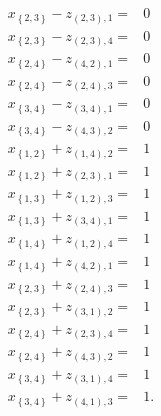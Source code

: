 \documentclass[10p,a4paper,BCOR = 12mm, DIV=15]{scrbook}
\begin{document}
{\begin{bew}
{\begin{align*}
x_{\left\{2, 3\right\}} - z_{\left(2, 3\right), 1} = & 0 \\
x_{\left\{2, 3\right\}} - z_{\left(2, 3\right), 4} = & 0 \\
x_{\left\{2, 4\right\}} - z_{\left(4, 2\right), 1} = & 0 \\
x_{\left\{2, 4\right\}} - z_{\left(2, 4\right), 3} = & 0 \\
x_{\left\{3, 4\right\}} - z_{\left(3, 4\right), 1} = & 0 \\
x_{\left\{3, 4\right\}} - z_{\left(4, 3\right), 2} = & 0 \\
x_{\left\{1, 2\right\}} + z_{\left(1, 4\right), 2} = & 1 \\
x_{\left\{1, 2\right\}} + z_{\left(2, 3\right), 1} = & 1 \\
x_{\left\{1, 3\right\}} + z_{\left(1, 2\right), 3} = & 1 \\
x_{\left\{1, 3\right\}} + z_{\left(3, 4\right), 1} = & 1 \\
x_{\left\{1, 4\right\}} + z_{\left(1, 2\right), 4} = & 1 \\
x_{\left\{1, 4\right\}} + z_{\left(4, 2\right), 1} = & 1 \\
x_{\left\{2, 3\right\}} + z_{\left(2, 4\right), 3} = & 1 \\
x_{\left\{2, 3\right\}} + z_{\left(3, 1\right), 2} = & 1 \\
x_{\left\{2, 4\right\}} + z_{\left(2, 3\right), 4} = & 1 \\
x_{\left\{2, 4\right\}} + z_{\left(4, 3\right), 2} = & 1 \\
x_{\left\{3, 4\right\}} + z_{\left(3, 1\right), 4} = & 1 \\
x_{\left\{3, 4\right\}} + z_{\left(4, 1\right), 3} = & 1.
\end{align*}
}


\end{bew}}
\end{document}
